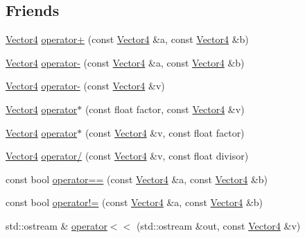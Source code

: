 \subsection*{Friends}
\begin{DoxyCompactItemize}
\item 
\hyperlink{classprism_1_1geometry_1_1_vector4}{Vector4} \hyperlink{classprism_1_1geometry_1_1_vector4_ae6ce8e3ce943c6e0e021eb292bb01208}{operator+} (const \hyperlink{classprism_1_1geometry_1_1_vector4}{Vector4} \&a, const \hyperlink{classprism_1_1geometry_1_1_vector4}{Vector4} \&b)
\item 
\hyperlink{classprism_1_1geometry_1_1_vector4}{Vector4} \hyperlink{classprism_1_1geometry_1_1_vector4_a9b64f4645ae585ab1e5fa126dd98f5fa}{operator-\/} (const \hyperlink{classprism_1_1geometry_1_1_vector4}{Vector4} \&a, const \hyperlink{classprism_1_1geometry_1_1_vector4}{Vector4} \&b)
\item 
\hyperlink{classprism_1_1geometry_1_1_vector4}{Vector4} \hyperlink{classprism_1_1geometry_1_1_vector4_a7e3cd0b84429212e7bc90b1303c40745}{operator-\/} (const \hyperlink{classprism_1_1geometry_1_1_vector4}{Vector4} \&v)
\item 
\hyperlink{classprism_1_1geometry_1_1_vector4}{Vector4} \hyperlink{classprism_1_1geometry_1_1_vector4_adf3322b5c26c3980099d4107de87da3f}{operator$\ast$} (const float factor, const \hyperlink{classprism_1_1geometry_1_1_vector4}{Vector4} \&v)
\item 
\hyperlink{classprism_1_1geometry_1_1_vector4}{Vector4} \hyperlink{classprism_1_1geometry_1_1_vector4_a81501097861bb0b690ca7c90e2e1d939}{operator$\ast$} (const \hyperlink{classprism_1_1geometry_1_1_vector4}{Vector4} \&v, const float factor)
\item 
\hyperlink{classprism_1_1geometry_1_1_vector4}{Vector4} \hyperlink{classprism_1_1geometry_1_1_vector4_ab5fc8b1992d116a82ba7f98c5abb5aab}{operator/} (const \hyperlink{classprism_1_1geometry_1_1_vector4}{Vector4} \&v, const float divisor)
\item 
const bool \hyperlink{classprism_1_1geometry_1_1_vector4_a33f84e1c4932af7978db9d5f0e20dfbb}{operator==} (const \hyperlink{classprism_1_1geometry_1_1_vector4}{Vector4} \&a, const \hyperlink{classprism_1_1geometry_1_1_vector4}{Vector4} \&b)
\item 
const bool \hyperlink{classprism_1_1geometry_1_1_vector4_ac0b8fb256f3d31d841e810255069ffeb}{operator!=} (const \hyperlink{classprism_1_1geometry_1_1_vector4}{Vector4} \&a, const \hyperlink{classprism_1_1geometry_1_1_vector4}{Vector4} \&b)
\item 
std\+::ostream \& \hyperlink{classprism_1_1geometry_1_1_vector4_ad3d5a5ec411160580fac5b90bb0fa28c}{operator$<$$<$} (std\+::ostream \&out, const \hyperlink{classprism_1_1geometry_1_1_vector4}{Vector4} \&v)
\end{DoxyCompactItemize}


